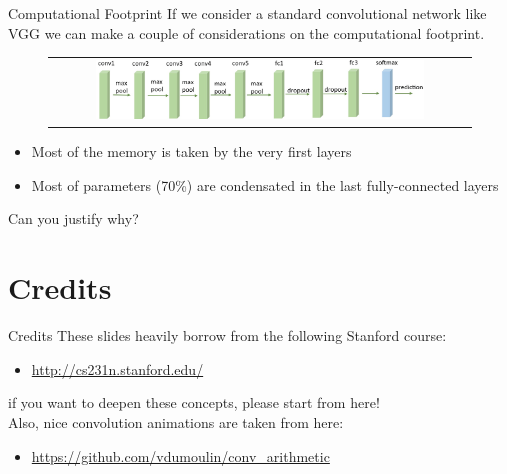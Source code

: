 \documentclass[aspectratio=169]{beamer}
\begin{document}

\begin{frame}{Computational Footprint}
If we consider a standard convolutional network like VGG \cite{simonyan2014very} we can make a couple of considerations on the computational footprint.
\begin{figure}
\begin{tabular}{c}
\includegraphics[width=0.8\textwidth]{img/cnn/vgg16.jpg}
\end{tabular}
\end{figure}
\begin{itemize}
\item Most of the memory is taken by the very first layers
\item Most of parameters (70\%) are condensated in the last fully-connected layers
\end{itemize}
\small{Can you justify why?}
\end{frame}





\section{Credits}

\begin{frame}{Credits}
These slides heavily borrow from the following Stanford course:
\begin{itemize}
\item \url{http://cs231n.stanford.edu/}
\end{itemize}
if you want to deepen these concepts, please start from here!\\
\vspace{0.2cm}
Also, nice convolution animations are taken from here:
\begin{itemize}
\item \url{https://github.com/vdumoulin/conv_arithmetic}
\end{itemize}
\end{frame}
\end{document}
